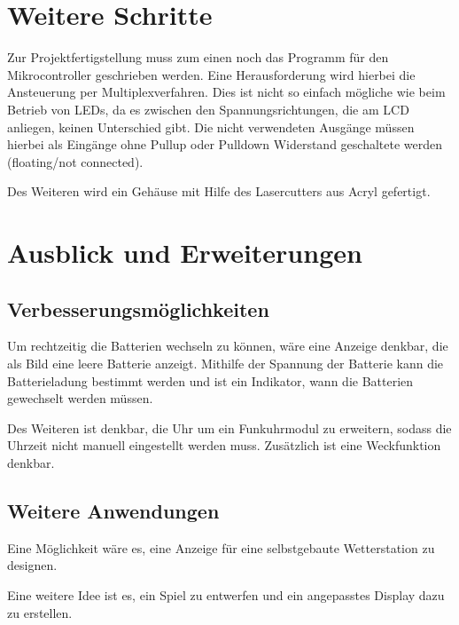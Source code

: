 \section{Weitere Schritte}

Zur Projektfertigstellung muss zum einen noch das Programm für den Mikrocontroller geschrieben werden. Eine Herausforderung wird hierbei die Ansteuerung per Multiplexverfahren. Dies ist nicht so einfach mögliche wie beim Betrieb von LEDs, da es zwischen den Spannungsrichtungen, die am LCD anliegen, keinen Unterschied gibt. Die nicht verwendeten Ausgänge müssen hierbei als Eingänge ohne Pullup oder Pulldown Widerstand geschaltete werden (floating/not connected).

Des Weiteren wird ein Gehäuse mit Hilfe des Lasercutters aus Acryl gefertigt.


\section{Ausblick und Erweiterungen}


\subsection{Verbesserungsmöglichkeiten}

Um rechtzeitig die Batterien wechseln zu können, wäre eine Anzeige denkbar, die als Bild eine leere Batterie anzeigt. Mithilfe der Spannung der Batterie kann die Batterieladung bestimmt werden und ist ein Indikator, wann die Batterien gewechselt werden müssen.

Des Weiteren ist denkbar, die Uhr um ein Funkuhrmodul zu erweitern, sodass die Uhrzeit nicht manuell eingestellt werden muss. Zusätzlich ist eine Weckfunktion denkbar.


\subsection{Weitere Anwendungen}

Eine Möglichkeit wäre es, eine Anzeige für eine selbstgebaute Wetterstation zu designen.

Eine weitere Idee ist es, ein Spiel zu entwerfen und ein angepasstes Display dazu zu erstellen.

